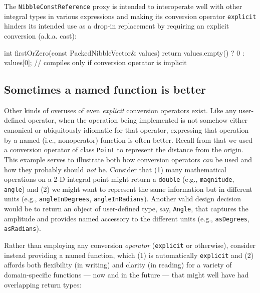 \noindent The \lstinline!NibbleConstReference! proxy is intended to interoperate well with other integral types in various expressions and making its conversion operator \lstinline!explicit! hinders its intended use as a drop-in replacement by requiring an explicit conversion (a.k.a. cast):

\begin{emcppslisting}[emcppsbatch=e3]
int firstOrZero(const PackedNibbleVector& values)
{
    return values.empty()
        ? 0
        : values[0]; // compiles only if conversion operator is implicit
}
\end{emcppslisting}


\subsection[Sometimes a named function is better]{Sometimes a named function is better}\label{sometimes-a-named-function-is-better}

Other kinds of overuses of even \emph{explicit} conversion
operators exist. Like any user-defined operator, when the operation being
implemented is not somehow either canonical or ubiquitously idiomatic
for that operator, expressing that operation by a
named (i.e., nonoperator) function is often better. Recall from 
that we used a conversion operator of
class \lstinline!Point! to represent the distance from the origin. This
example serves to illustrate both how conversion operators \emph{can} be
used and how they probably should \emph{not} be. Consider that (1)
many mathematical operations on a 2-D integral point might return a \lstinline!double! (e.g., \lstinline!magnitude!,
\lstinline!angle!) and (2) we might want to represent the same
information but in different units (e.g., \lstinline!angleInDegrees!,
\lstinline!angleInRadians!). Another valid design
decision would be to return an object of user-defined type, say, \lstinline!Angle!, that captures
the amplitude and provides named accessory to the different units
  (e.g., \lstinline!asDegrees!, \lstinline!asRadians!).

Rather than employing any conversion \emph{operator} (\lstinline!explicit!
or otherwise), consider instead providing a named function, which (1) is
automatically \lstinline!explicit! and (2) affords both flexibility (in
writing) and clarity (in reading) for a variety of domain-specific
functions --- now and in the future --- that might well have had
overlapping return types:

